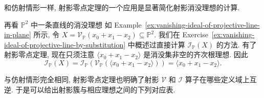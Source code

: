 和仿射情形一样, 射影零点定理的一个应用是显著简化射影消没理想的计算.

\begin{Example}{再看 $\mathbb{P}^{2}$ 中一条直线的消没理想}\leavevmode\label{ex:projective-line-ideal-by-nullstellensatz}
如 Example~\ref{ex:vanishing-ideal-of-projective-line-in-plane} 所示, 令 $X=\mathcal{V}_{\mathbb{P}}(x_{0}+x_{1}-x_{2})\subseteq\mathbb{P}^{2}$. 我们在 Exercise~\ref{ex:vanishing-ideal-of-projective-line-by-substitution} 中概述过直接计算 $\mathcal{I}_{\mathbb{P}}(X)$ 的方法. 有了射影零点定理, 现在只须注意 $\langle x_{0}+x_{1}-x_{2}\rangle$ 是消没集非空的齐次根理想. 因此
\[
  \mathcal{I}_{\mathbb{P}}(X)
  =\mathcal{I}_{\mathbb{P}}(\mathcal{V}_{\mathbb{P}}(\langle x_{0}+x_{1}-x_{2}\rangle))
  =\langle x_{0}+x_{1}-x_{2}\rangle.
\]
\end{Example}

与仿射情形完全相同, 射影零点定理也明确了射影 $\mathcal{V}$ 和 $\mathcal{I}$ 算子在哪些定义域上互逆. 于是可以给出射影簇与相应理想之间的下列对应表.

